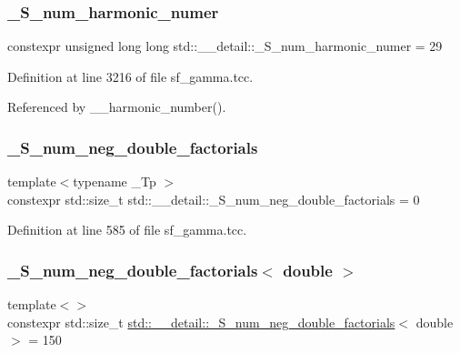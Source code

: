 \subsubsection{\texorpdfstring{\+\_\+\+S\+\_\+num\+\_\+harmonic\+\_\+numer}{\_S\_num\_harmonic\_numer}}
{\footnotesize\ttfamily constexpr unsigned long long std\+::\+\_\+\+\_\+detail\+::\+\_\+\+S\+\_\+num\+\_\+harmonic\+\_\+numer = 29}



Definition at line 3216 of file sf\+\_\+gamma.\+tcc.



Referenced by \+\_\+\+\_\+harmonic\+\_\+number().

\mbox{\label{namespacestd_1_1____detail_ac386f200e589ce1fc895c2aac0e47f8c}} 
\subsubsection{\texorpdfstring{\+\_\+\+S\+\_\+num\+\_\+neg\+\_\+double\+\_\+factorials}{\_S\_num\_neg\_double\_factorials}}
{\footnotesize\ttfamily template$<$typename \+\_\+\+Tp $>$ \\
constexpr std\+::size\+\_\+t std\+::\+\_\+\+\_\+detail\+::\+\_\+\+S\+\_\+num\+\_\+neg\+\_\+double\+\_\+factorials = 0}



Definition at line 585 of file sf\+\_\+gamma.\+tcc.

\mbox{\label{namespacestd_1_1____detail_a2d14a1207a6fea22f32586dfd41cf49d}} 
\subsubsection{\texorpdfstring{\+\_\+\+S\+\_\+num\+\_\+neg\+\_\+double\+\_\+factorials$<$ double $>$}{\_S\_num\_neg\_double\_factorials< double >}}
{\footnotesize\ttfamily template$<$$>$ \\
constexpr std\+::size\+\_\+t \hyperlink{namespacestd_1_1____detail_ac386f200e589ce1fc895c2aac0e47f8c}{std\+::\+\_\+\+\_\+detail\+::\+\_\+\+S\+\_\+num\+\_\+neg\+\_\+double\+\_\+factorials}$<$ double $>$ = 150}



